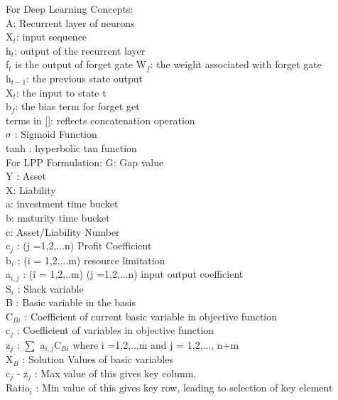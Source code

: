 For Deep Learning Concepts:\\
A: Recurrent layer of neurons\\
X$_{t}$: input sequence\\
h$_{t}$: output of the recurrent layer\\
f$_{t}$ is the output of forget gate
W$_{f}$: the weight associated with forget gate\\
h$_{t-1}$: the previous state output\\
X$_{t}$: the input to state t\\
b$_{f}$: the bias term for forget get\\
terms in []: reflects concatenation operation\\
$\sigma$ : Sigmoid Function\\
tanh : hyperbolic tan function\\

For LPP Formulation:
G: Gap value\\
Y : Asset\\
X: Liability\\
a: investment time bucket\\
b: maturity time bucket\\
c: Asset/Liability Number\\
c$_{j}$ : (j =1,2,...n) Profit Coefficient \\
b$_{i}$ : (i = 1,2,...m) resource limitation \\
a$_{i,j}$ : (i = 1,2,..m) (j =1,2,...n) input output coefficient \\ 
S$_{i}$ : Slack variable \\ 
B : Basic variable in the basis \\ 
C$_{Bi}$ : Coefficient of current basic variable in objective function \\ 
c$_{j}$ : Coefficient of variables in objective function \\ 
z$_{j}$ : $\sum$ a$_{i,j}$C$_{Bi}$ where i =1,2,...m and j = 1,2,..., n+m \\ 
X$_{B}$ :  Solution Values of basic variables \\ 
c$_{j}$ - z$_{j}$ : Max value of this gives key column. \\ 
Ratio$_{i}$ : Min value of this gives key row, leading to selection of key element \\ 


